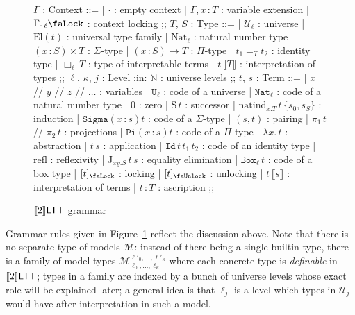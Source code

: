 \begin{figure}
\centering
\begin{bnf}
$\Gamma$ : Context ::=
    | $\cdot$ : empty context
    | $\Gamma,x\,\colon T$ : variable extension
    | $\Gamma.\,{}_\ell\text{\faLock}$
    : context locking
    ;;
$T$, $S$ : Type ::=
    | $\mathcal{U}_\ell$ : universe
    | $\mathrm{El}(t)$ : universal type family
    | $\mathrm{Nat}_\ell$ : natural number type
    | $(x\,\colon S)\times T$ : $\Sigma$-type
    | $(x\,\colon S)\to T$ : $\Pi$-type
    | $t_1=_T t_2$ : identity type
    | $\Box_\ell\,T$ : type of interpretable terms
    | $t\,\llbracket T\rrbracket$
        : interpretation of types
    ;;
$\ell$, $\kappa$, $j$ : Level :in: $\mathbb{N}$
    : universe levels ;;
$t$, $s$ : Term ::=
    | $x$ // $y$ // $z$ // $\ldots$
        : variables
    | $\mathtt{U}_\ell$ : code of a universe
    | $\mathtt{Nat}_\ell$
        : code of a natural number type
    | $0$ : zero
    | $\mathrm{S}\,t$ : successor
    | $\mathrm{natind}_{x.T}\,t\,\{s_0,s_S\}$
        : induction
    | $\mathtt{Sigma}(x\,\colon s)t$
        : code of a $\Sigma$-type
    | $(s, t)$ : pairing
    | $\pi_1\,t$ // $\pi_2\,t$ : projections
    | $\mathtt{Pi}(x\,\colon s)t$
        : code of a $\Pi$-type
    | $\lambda x.\,t$ : abstraction
    | $t\,s$ : application
    | $\mathtt{Id}\,t\,t_1\,t_2$
        : code of an identity type
    | $\mathrm{refl}$ : reflexivity
    | $\mathrm{J}_{xy.S}\,t\,s$
        : equality elimination
    | $\mathtt{Box}_\ell\,t$ : code of a box type
    | $[t]_\text{\faLock}$ : locking
    | $[t]_\text{\faUnlock}$ : unlocking
    | $t\,\llbracket s\rrbracket$
        : interpretation of terms
    | $t\,\colon T$ : ascription
    ;;
\end{bnf}
\caption{$\llbracket 2\rrbracket\mathsf{LTT}$ grammar}
\label{twoltt-grammar}
\end{figure}

Grammar rules given in Figure~\ref{twoltt-grammar}
reflect the discussion above. Note that there is no
separate type of models $\mathcal{M}$: instead of there
being a single builtin type, there is a family of
model types $\mathcal{M}_{\ell_0,\ldots,\ell_\kappa}^{
    \ell'_0,\ldots,\ell'_\kappa}$ where each concrete
type is \emph{definable} in $\llbracket 2\rrbracket\mathsf{LTT}$; types in a
family are indexed by a bunch of universe levels whose
exact role will be explained later; a general idea is
that $\ell_j$ is a level which types in $\mathcal{U}_j$
would have after interpretation in such a model.

